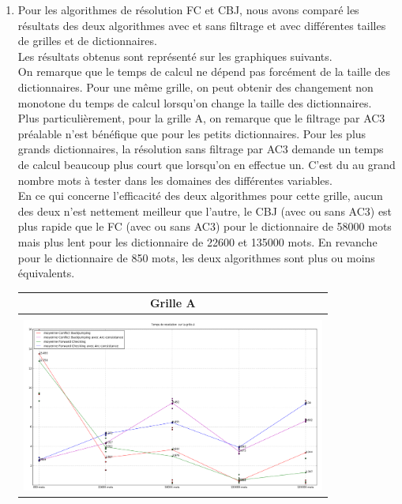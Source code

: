 \documentclass[a4paper,12pt]{report}
\begin{document}
\begin{enumerate}
\newpage
~~\\
~~\\
~~\\
\item Pour les algorithmes de résolution FC et CBJ, nous avons comparé les résultats des deux algorithmes avec et sans filtrage et avec différentes tailles de grilles et de dictionnaires.\\
Les résultats obtenus sont représenté sur les graphiques suivants.\\

On remarque que le temps de calcul ne dépend pas forcément de la taille des dictionnaires. Pour une même grille, on peut obtenir des changement non monotone du temps de calcul lorsqu'on change la taille des dictionnaires.\\

Plus particulièrement, pour la grille A, on remarque que le filtrage par AC3 préalable n'est bénéfique que pour les petits dictionnaires. Pour les plus grands dictionnaires, la résolution sans filtrage par AC3 demande un temps de calcul beaucoup plus court que lorsqu'on en effectue un. C'est du au grand nombre mots à tester dans les domaines des différentes variables.\\

En ce qui concerne l'efficacité des deux algorithmes pour cette grille, aucun des deux n'est nettement meilleur que l'autre, le CBJ (avec ou sans AC3) est plus rapide que le FC (avec ou sans AC3) pour le dictionnaire de 58000 mots mais plus lent pour les dictionnaire de 22600 et 135000 mots. En revanche pour le dictionnaire de 850 mots, les deux algorithmes sont plus ou moins équivalents.


\begin{table}[!h]
\begin{center}
\begin{tabular}{|c|}

\hline
  Grille A\\
\hline   
   \\
\includegraphics[width=10cm]{Grille_A.png}  \\
\hline



\end{tabular}
\end{center}
\end{table}
\end{enumerate}
\end{document}
